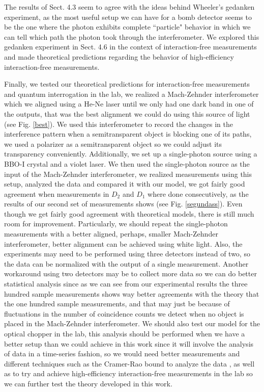 \documentclass[12pt]{book}
\begin{document}
The results of Sect. 4.3 seem to agree with the ideas behind Wheeler's gedanken experiment, as the most useful setup we can have for a bomb detector seems to be the one where the photon exhibits complete ``particle" behavior in which we can tell which path the photon took through the interferometer. We explored this gedanken experiment in Sect. 4.6 in the context of interaction-free measurements and made theoretical predictions regarding the behavior of high-efficiency interaction-free measurements.

Finally, we tested our theoretical predictions for interaction-free measurements and quantum interrogation in the lab, we realized a Mach-Zehnder interferometer which we aligned using a He-Ne laser until we only had one dark band in one of the outputs, that was the best alignment we could do using this source of light (see Fig. \ref{best}). We used this interferometer to record the changes in the interference pattern when a semitransparent object is blocking one of its paths, we used a polarizer as a semitransparent object so we could adjust its transparency conveniently. Additionally, we set up a single-photon source using a BBO-I crystal and a violet laser. We then used the single-photon source as the input of the Mach-Zehnder interferometer, we realized measurements using this setup, analyzed the data and compared it with our model, we got fairly good agreement when measurements in $D_{2}$ and $D_{1}$ where done consecutively, as the results of our second set of measurements shows (see Fig. \ref{segundass}). Even though we get fairly good agreement with theoretical models, there is still much room for improvement. Particularly, we should repeat the single-photon measurements with a better aligned, perhaps, smaller Mach-Zehnder interferometer, better alignment can be achieved using white light. Also, the experiments may need to be performed using three detectors instead of two, so the data can be normalized with the output of a single measurement. Another workaround using two detectors may be to collect more data so we can do better statistical analysis since as we can see from our experimental results the three hundred sample measurements shows way better agreements with the theory that the one hundred sample measurements, and that may just be because of fluctuations in the number of coincidence counts we detect when no object is placed in the Mach-Zehnder interferometer. We should also test our model for the optical chopper in the lab, this analysis should be performed when we have a better setup than we could achieve in this work since it will involve the analysis of data in a time-series fashion, so we would need better measurements and different techniques such as the Cramer-Rao bound to analyze the data \cite{Ferrie}, as well as to try and achieve high-efficiency interaction-free measurements in the lab so we can further test the theory developed in this work.  



\pagebreak



\end{document}
